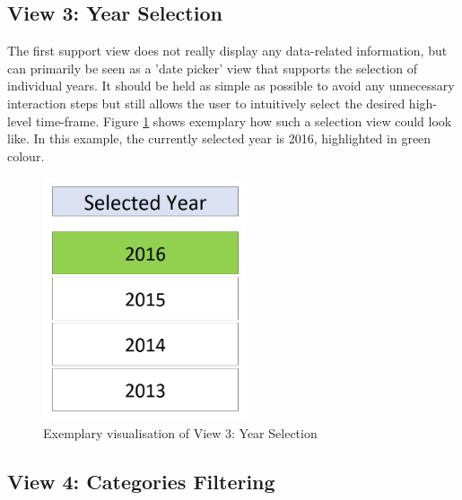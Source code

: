 \subsection{View 3: Year Selection}

The first support view does not really display any data-related information, but can primarily be seen as a 'date picker' view that supports the selection of individual years. It should be held as simple as possible to avoid any unnecessary interaction steps but still allows the user to intuitively select the desired high-level time-frame. Figure \ref{fig:view3chart} shows exemplary how such a selection view could look like. In this example, the currently selected year is 2016, highlighted in green colour.
\begin{figure}[h]
	\begin{center}
		\includegraphics[width=6cm]{03_Figures/07_Suggestion/View3_YearSelection.png}
		\caption{Exemplary visualisation of View 3: Year Selection}
		\label{fig:view3chart}
	\end{center}
\end{figure}


\subsection{View 4: Categories Filtering}

\label{SubSectionCategoriesFiltering}

